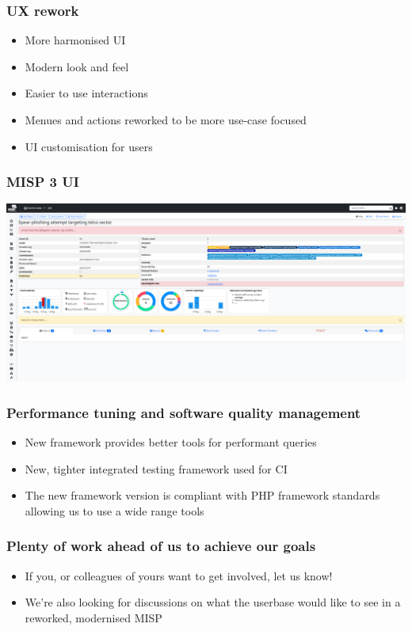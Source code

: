 \begin{frame}
  \frametitle{UX rework}
  \begin{itemize}
     \item More harmonised UI
     \item Modern look and feel
     \item Easier to use interactions
     \item Menues and actions reworked to be more use-case focused
     \item UI customisation for users
  \end{itemize}
\end{frame}

\begin{frame}
\frametitle{MISP 3 UI}
\begin{center}
\includegraphics[scale=0.18]{images/misp3.png}
\end{center}
\end{frame}

\begin{frame}
  \frametitle{Performance tuning and software quality management}
  \begin{itemize}
     \item New framework provides better tools for performant queries
     \item New, tighter integrated testing framework used for CI
     \item The new framework version is compliant with PHP framework standards allowing us to use a wide range tools
  \end{itemize}
\end{frame}

\begin{frame}
  \frametitle{Plenty of work ahead of us to achieve our goals}
  \begin{itemize}
     \item If you, or colleagues of yours want to get involved, let us know!
     \item We're also looking for discussions on what the userbase would like to see in a reworked, modernised MISP
  \end{itemize}
\end{frame}


